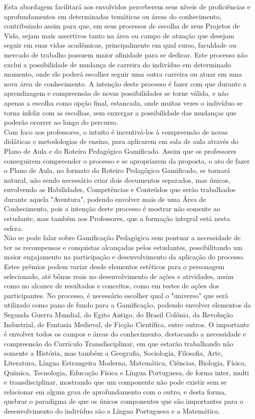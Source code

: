 Esta abordagem facilitará aos envolvidos perceberem seus níveis de proficiências e aprofundamentos em determinadas temáticas ou áreas do conhecimento, contribuindo assim para que, em seus processos de escolha de seus Projetos de Vida, sejam mais assertivos tanto na área ou campo de atuação que desejam seguir em suas vidas acadêmicas, principalmente em qual curso, faculdade ou mercado de trabalho possuem maior afinidade para se dedicar. Este processo não exclui a possibilidade de mudança de carreira do indivíduo em determinado momento, onde ele poderá escolher seguir uma outra carreira ou atuar em uma nova área de conhecimento. A intenção deste processo é fazer com que durante a aprendizagem e compreensão de novas possibilidades se torne válida, e não apenas a escolha como opção final, estancada, onde muitas vezes o indivíduo se torna infeliz com as escolhas, sem enxergar a possibilidade das mudanças que poderão ocorrer ao longo do percurso.  
\\

Com foco aos professores, o intuito é incentivá-los à compreensão de novas didáticas e metodologias de ensino, para aplicarem em sala de aula através do Plano de Aula e do Roteiro Pedagógico Gamificado. Assim que os professores conseguirem compreender o processo e se apropriarem da proposta, o ato de fazer o Plano de Aula, no formato do Roteiro Pedagógico Gamificado, se tornará natural, não sendo necessário criar dois documentos separados, mas únicos, envolvendo as Habilidades, Competências e Conteúdos que serão trabalhados durante aquela "Aventura", podendo envolver mais de uma Área de Conhecimento, pois a intenção deste processo é mostrar não somente ao estudante, mas também aos Professores, que a formação integral está nesta esfera.
\\

Não se pode falar sobre Gamificação Pedagógica sem pontuar a necessidade de ter as recompensas e conquistas alcançadas pelos estudantes, possibilitando um maior engajamento na participação e desenvolvimento da aplicação do processo. Estes prêmios podem variar desde elementos estéticos para o personagem selecionado, até bônus reais no desenvolvimento de ações e atividades, assim como no alcance de resultados e conceitos, como em testes de ações dos participantes. No processo, é necessário escolher qual o
"universo" que será utilizado como pano de fundo para a Gamificação, podendo envolver elementos da Segunda Guerra Mundial, do Egito Antigo, do Brasil Colônia, da Revolução Industrial, de Fantasia Medieval, de Ficção Científica, entre outros. O importante é envolver todos os campos e áreas do conhecimento, destacando a necessidade e compreensão do Currículo Transdisciplinar, em que estarão trabalhando não somente a História, mas também a Geografia, Sociologia, Filosofia, Arte, Literatura, Língua Estrangeira Moderna, Matemática, Ciências, Biologia, Física, Química, Tecnologia, Educação Física e Língua Portuguesa, de forma inter, multi e transdisciplinar, mostrando que um componente não pode existir sem se
relacionar em algum grau de aprofundamento com o outro, e desta forma, quebrar o paradigma de que os únicos componentes que são importantes para o desenvolvimento do indivíduo são a Língua Portuguesa e a Matemática.
\\

